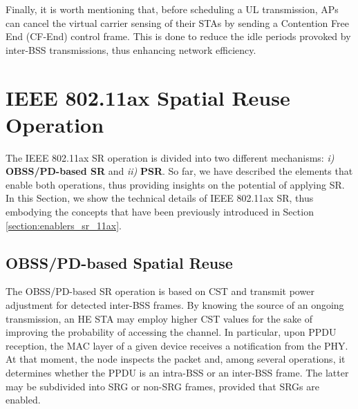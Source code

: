 \documentclass{ieeeaccess}
\begin{document}
Finally, it is worth mentioning that, before scheduling a UL transmission, APs can cancel the virtual carrier sensing of their STAs by sending a Contention Free End (CF-End) control frame. This is done to reduce the idle periods provoked by inter-BSS transmissions, thus enhancing network efficiency. 


\section{IEEE 802.11ax Spatial Reuse Operation}
\label{section:operation_sr_11ax}
The IEEE 802.11ax SR operation is divided into two different mechanisms: \emph{i)} \textbf{OBSS/PD-based SR} and \emph{ii)} \textbf{PSR}. So far, we have described the elements that enable both operations, thus providing insights on the potential of applying SR. In this Section, we show the technical details of IEEE 802.11ax SR, thus embodying the concepts that have been previously introduced in Section \ref{section:enablers_sr_11ax}.

\subsection{OBSS/PD-based Spatial Reuse}
\label{section:obss_pd_based}
The OBSS/PD-based SR operation is based on CST and transmit power adjustment for detected inter-BSS frames. By knowing the source of an ongoing transmission, an HE STA may employ higher CST values for the sake of improving the probability of accessing the channel. In particular, upon PPDU reception, the MAC layer of a given device receives a notification from the PHY. At that moment, the node inspects the packet and, among several operations, it determines whether the PPDU is an intra-BSS or an inter-BSS frame. The latter may be subdivided into SRG or non-SRG frames, provided that SRGs are enabled.

\end{document}
